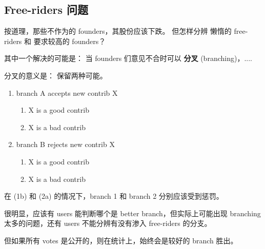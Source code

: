 \documentclass[12pt, orivec]{article}
\newcommand{\cc}[2]{#1}
\newcommand{\cc}[2]{#2}
\begin{document}
\footnotesize

\secttoc
\subsection{\cc{Free-riders 问题}{The problem of free-riders}}

\cc{
按道理，那些不作为的 founders，其股份应该下跌。  但怎样分辨 懒惰的 free-riders 和 要求较高的 founders？
}{
In principle, if a founder hoards shares without performing useful work, his shares in the company should be reduced.	 But how could we distinguish between lazy free-riders and someone who has high standards for other people's work?
}

\cc{
其中一个解决的可能是： 当 founders 们意见不合时可以 \textbf{分叉} (branching)，....
}{
A possible solution is via \textbf{branching} when founders disagree with each other.
}

\cc{
分叉的意义是： 保留两种可能。 
}{
The essence of branching is:  to preserve both options in a disagreement.
}

\begin{enumerate}
	\item branch A accepts new contrib X
	\begin{enumerate}
		\item X is a good contrib
		\item X is a bad contrib
	\end{enumerate}
	\item branch B rejects new contrib X
	\begin{enumerate}
		\item X is a good contrib
		\item X is a bad contrib
	\end{enumerate}
\end{enumerate}

\cc{
在 (1b) 和 (2a) 的情况下，branch 1 和 branch 2 分别应该受到惩罚。
}{
In cases (1b) and (2a), branch 1 and 2 should be penalized respectively.
}

\cc{
很明显，应该有 users 能判断哪个是 better branch，但实际上可能出现 branching 太多的问题，还有 users 不能分辨有没有渗入 free-riders 的分支。 
}{
Obviously, there should exist users who can determine which branches are better, but in practice there may be too many branches to consider.  Users may be unable to tell which branches are contaminated with free-riders. 
}

\cc{
但如果所有 votes 是公开的，则在统计上，始终会是较好的 branch 胜出。 
}{
However, if all votes are openly visible, then statistically we may believe that good branches will win out eventually.	
}
\end{document}
